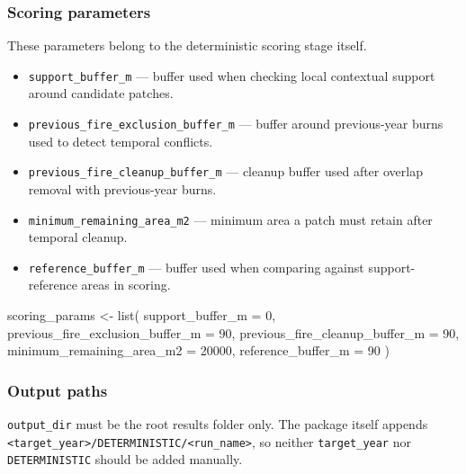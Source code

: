 \documentclass[
  british,
  a4paper,
]{scrbook}
\newenvironment{Shaded}{\begin{snugshade}}{\end{snugshade}}
\newcommand{\AttributeTok}[1]{\textcolor[rgb]{0.40,0.45,0.13}{#1}}
\newcommand{\DecValTok}[1]{\textcolor[rgb]{0.68,0.00,0.00}{#1}}
\newcommand{\FunctionTok}[1]{\textcolor[rgb]{0.28,0.35,0.67}{#1}}
\newcommand{\NormalTok}[1]{\textcolor[rgb]{0.00,0.23,0.31}{#1}}
\newcommand{\OtherTok}[1]{\textcolor[rgb]{0.00,0.23,0.31}{#1}}
\providecommand{\tightlist}{%
  \setlength{\itemsep}{0pt}\setlength{\parskip}{0pt}}
\begin{document}
\subsubsection{Scoring parameters}\label{scoring-parameters}

These parameters belong to the deterministic scoring stage itself.

\begin{itemize}
\tightlist
\item
  \texttt{support\_buffer\_m} --- buffer used when checking local
  contextual support around candidate patches.
\item
  \texttt{previous\_fire\_exclusion\_buffer\_m} --- buffer around
  previous-year burns used to detect temporal conflicts.
\item
  \texttt{previous\_fire\_cleanup\_buffer\_m} --- cleanup buffer used
  after overlap removal with previous-year burns.
\item
  \texttt{minimum\_remaining\_area\_m2} --- minimum area a patch must
  retain after temporal cleanup.
\item
  \texttt{reference\_buffer\_m} --- buffer used when comparing against
  support-reference areas in scoring.
\end{itemize}

\begin{Shaded}
\begin{Highlighting}[]
\NormalTok{scoring\_params }\OtherTok{\textless{}{-}} \FunctionTok{list}\NormalTok{(}
  \AttributeTok{support\_buffer\_m =} \DecValTok{0}\NormalTok{,}
  \AttributeTok{previous\_fire\_exclusion\_buffer\_m =} \DecValTok{90}\NormalTok{,}
  \AttributeTok{previous\_fire\_cleanup\_buffer\_m =} \DecValTok{90}\NormalTok{,}
  \AttributeTok{minimum\_remaining\_area\_m2 =} \DecValTok{20000}\NormalTok{,}
  \AttributeTok{reference\_buffer\_m =} \DecValTok{90}
\NormalTok{)}
\end{Highlighting}
\end{Shaded}

\subsubsection{Output paths}\label{output-paths}

\texttt{output\_dir} must be the root results folder only. The package
itself appends
\texttt{\textless{}target\_year\textgreater{}/DETERMINISTIC/\textless{}run\_name\textgreater{}},
so neither \texttt{target\_year} nor \texttt{DETERMINISTIC} should be
added manually.
\end{document}
